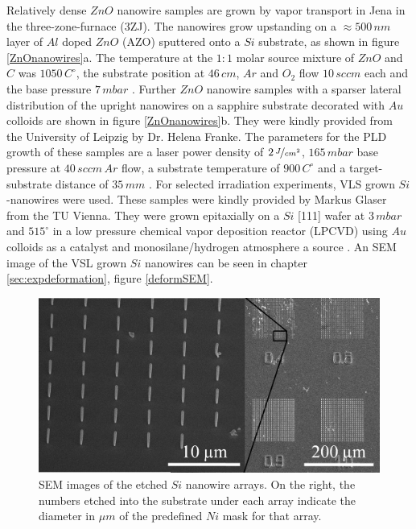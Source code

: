 Relatively dense $ZnO$ nanowire samples are grown by vapor transport in Jena in the three-zone-furnace (3ZJ). The nanowires grow upstanding on a $\approx 500\,nm$ layer of $Al$ doped $ZnO$ (AZO) sputtered onto a $Si$ substrate, as shown in figure \ref{ZnOnanowires}a. The temperature at the $1:1$ molar source mixture of $ZnO$ and $C$ was $1050\,C^\circ$, the substrate position at $46\, cm$, $Ar$ and $O_2$ flow $10\, sccm$ each and the base pressure $7\, mbar$ \cite{borchers_catalyst_2006, stichtenoth_dimensionseffekte_2008, muller_structural_2009,ogrisek_kontrolliertes_2013}. Further $ZnO$ nanowire samples with a sparser lateral distribution of the upright nanowires on a sapphire substrate decorated with $Au$ colloids are shown in figure \ref{ZnOnanowires}b. They were kindly provided from the University of Leipzig by Dr. Helena Franke. The parameters for the PLD growth of these samples are a laser power density of $2\, \nicefrac{J}{cm^2}$, $165\, mbar$ base pressure at $40\, sccm\, Ar$ flow, a substrate temperature of $900\, C^\circ$ and a target-substrate distance of $35\,mm$ \cite{cao_tuning_2010}. For selected irradiation experiments, VLS grown $Si$-nanowires were used. These samples were kindly provided by Markus Glaser from the TU Vienna. They were grown epitaxially on a $Si$ [111] wafer at $3\,mbar$ and $515^\circ$ in a low pressure chemical vapor deposition reactor (LPCVD) using $Au$ colloids as a catalyst and monosilane/hydrogen atmosphere a source \cite{lugstein_pressure-induced_2008,johannes_anomalous_2015}. An SEM image of the VSL grown $Si$ nanowires can be seen in chapter \ref{sec:expdeformation}, figure \ref{deformSEM}.

\begin{figure}
	\centering
		\includegraphics[width=.5\textwidth]{images/SEMarray.jpg}
	\caption{SEM images of the etched $Si$ nanowire arrays. On the right, the numbers etched into the substrate under each array indicate the diameter in $\mu m$ of the predefined $Ni$ mask for that array.}
	\label{SEMarray}
\end{figure} 

